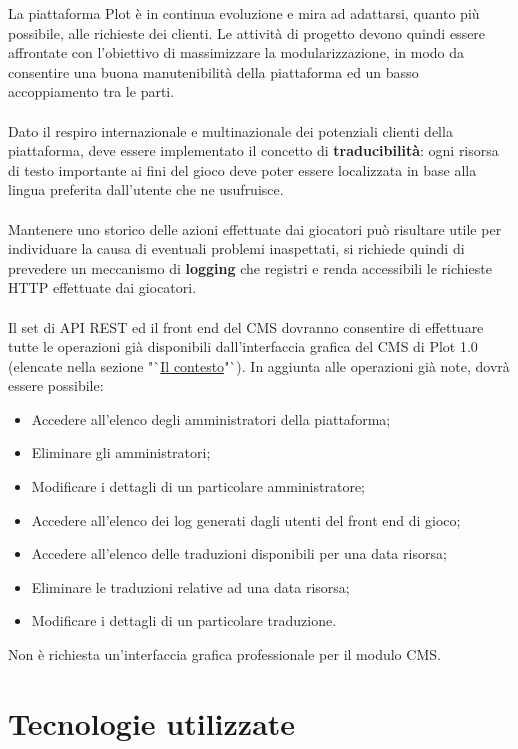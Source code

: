 La piattaforma Plot è in continua evoluzione e mira ad adattarsi, quanto più possibile, alle richieste dei clienti. Le attività di progetto devono quindi essere affrontate con l'obiettivo di massimizzare la modularizzazione, in modo da consentire una buona manutenibilità della piattaforma ed un basso accoppiamento tra le parti.
\\ \\
Dato il respiro internazionale e multinazionale dei potenziali clienti della piattaforma, deve essere implementato il concetto di \textbf{traducibilità}: ogni risorsa di testo importante ai fini del gioco deve poter essere localizzata in base alla lingua preferita dall'utente che ne usufruisce.
\\ \\
Mantenere uno storico delle azioni effettuate dai giocatori può risultare utile per individuare la causa di eventuali problemi inaspettati, si richiede quindi di prevedere un meccanismo di \textbf{logging} che registri e renda accessibili le richieste HTTP effettuate dai giocatori.
\\ \\
Il set di API REST ed il front end del CMS dovranno consentire di effettuare tutte le operazioni già disponibili dall'interfaccia grafica del CMS di Plot 1.0 (elencate nella sezione "`\hyperref[sec:hello]{Il contesto}"`). 
In aggiunta alle operazioni già note, dovrà essere possibile:
\begin{itemize}
	\item Accedere all'elenco degli amministratori della piattaforma;
	\item Eliminare gli amministratori;
	\item Modificare i dettagli di un particolare amministratore;
	\item Accedere all'elenco dei log generati dagli utenti del front end di gioco;
	\item Accedere all'elenco delle traduzioni disponibili per una data risorsa;
	\item Eliminare le traduzioni relative ad una data risorsa;
	\item Modificare i dettagli di un particolare traduzione.
\end{itemize}

Non è richiesta un'interfaccia grafica professionale per il modulo CMS.

\section{Tecnologie utilizzate}
